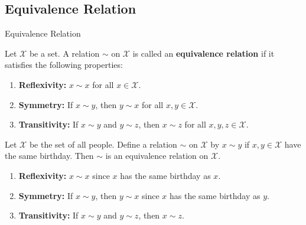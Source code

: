 \documentclass{zkdl-presentation-template}
\begin{document}
    \subsection{Equivalence Relation}
    \begin{frame}{Equivalence Relation}
        \begin{definition}
            Let $\mathcal{X}$ be a set. A relation $\sim$ on $\mathcal{X}$ is called an \textbf{equivalence relation} if it satisfies the following properties:
            \begin{enumerate}
                \item \textbf{Reflexivity:} $x \sim x$ for all $x \in \mathcal{X}$.\pause
                \item \textbf{Symmetry:} If $x \sim y$, then $y \sim x$ for all $x,y \in \mathcal{X}$.\pause
                \item \textbf{Transitivity:} If $x \sim y$ and $y \sim z$, then $x \sim z$ for all $x,y,z \in \mathcal{X}$.
            \end{enumerate}
        \end{definition}

        \pause\begin{example}
            Let $\mathcal{X}$ be the set of all people. Define a relation $\sim$ on $\mathcal{X}$ by $x \sim y$ if $x,y \in \mathcal{X}$ have the same birthday.
            Then $\sim$ is an equivalence relation on $\mathcal{X}$.
            \begin{enumerate}
                \item \textbf{Reflexivity:} $x \sim x$ since $x$ has the same birthday as $x$.\pause
                \item \textbf{Symmetry:} If $x \sim y$, then $y \sim x$ since $x$ has the same birthday as $y$.\pause
                \item \textbf{Transitivity:} If $x \sim y$ and $y \sim z$, then $x \sim z$.
            \end{enumerate}
        \end{example}
    \end{frame}
\end{document}
